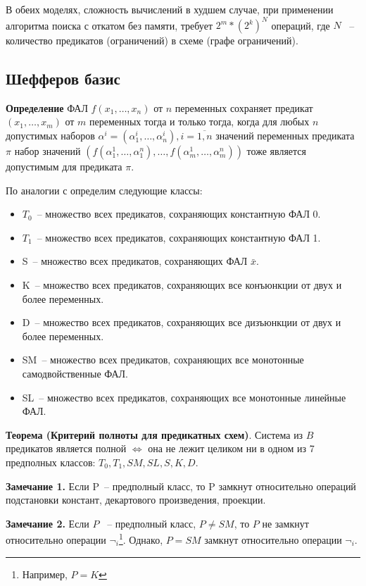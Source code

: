 \documentclass[12pt]{article}
\begin{document}
В обеих моделях, сложность вычислений в худшем случае, при применении алгоритма поиска 
с откатом без памяти, требует $2^m * (2^k)^N$ операций, где $N$ ~-- количество предикатов (ограничений) 
в схеме (графе ограничений).

\subsection{Шефферов базис}

\textbf{Определение} ФАЛ
$f (x_1, \ldots, x_n)$ от $n$ переменных сохраняет предикат $ (x_1, \ldots, x_m)$ от $m$
переменных тогда и только тогда, когда для любых $n$ допустимых наборов $\alpha^i = (\alpha_1^i, \ldots, \alpha_n^i), 
i = \overline{1, n}$ значений переменных предиката $\pi$ набор
значений $( f(\alpha_1^1, \ldots, \alpha_1^n), \ldots, f(\alpha_m^1, \ldots, \alpha_m^n) )$
тоже является допустимым для предиката $\pi$.

По аналогии с \cite{Shu11} определим следующие классы:
\begin{itemize}
    \item{$T_0$}~-- множество всех предикатов, сохраняющих константную ФАЛ 0.
    \item{$T_1$}~-- множество всех предикатов, сохраняющих константную ФАЛ 1.
    \item{S}~-- множество всех предикатов, сохраняющих ФАЛ $\bar{x}$.
    \item{K}~-- множество всех предикатов, сохраняющих все конъюнкции от двух и более переменных.
    \item{D}~-- множество всех предикатов, сохраняющих все дизъюнкции от двух и более переменных.
    \item{SM}~-- множество всех предикатов, сохраняющих все монотонные самодвойственные ФАЛ.
    \item{SL}~-- множество всех предикатов, сохраняющих все монотонные линейные ФАЛ.
\end{itemize}

\textbf{Теорема (Критерий полноты для предикатных схем)}. Система из $B$ предикатов является полной $\iff$
она не лежит целиком ни в одном из 7 предполных классов: $T_0, T_1, SM, SL, S, K, D$. \cite{Shu11} 

\textbf{Замечание 1.} Если P~-- предполный класс, то P замкнут относительно операций подстановки констант,
декартового произведения, проекции.

\textbf{Замечание 2.} Если $P$ ~-- предполный класс, $P \neq SM$, то $P$ не замкнут
относительно операции $\neg_i$\footnote{Например, $P = K$}.
Однако, $P = SM$ замкнут относительно операции $\neg_i$.
\end{document}

